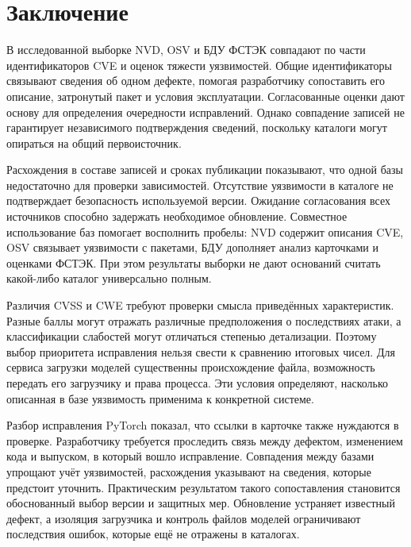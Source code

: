 \documentclass[12pt,a4paper]{report}
\begin{document}
\chapter*{Заключение}

В исследованной выборке NVD, OSV и БДУ ФСТЭК совпадают по части идентификаторов CVE и оценок тяжести уязвимостей. Общие идентификаторы связывают сведения об одном дефекте, помогая разработчику сопоставить его описание, затронутый пакет и условия эксплуатации. Согласованные оценки дают основу для определения очередности исправлений. Однако совпадение записей не гарантирует независимого подтверждения сведений, поскольку каталоги могут опираться на общий первоисточник.

Расхождения в составе записей и сроках публикации показывают, что одной базы недостаточно для проверки зависимостей. Отсутствие уязвимости в каталоге не подтверждает безопасность используемой версии. Ожидание согласования всех источников способно задержать необходимое обновление. Совместное использование баз помогает восполнить пробелы: NVD содержит описания CVE, OSV связывает уязвимости с пакетами, БДУ дополняет анализ карточками и оценками ФСТЭК. При этом результаты выборки не дают оснований считать какой-либо каталог универсально полным.

Различия CVSS и CWE требуют проверки смысла приведённых характеристик. Разные баллы могут отражать различные предположения о последствиях атаки, а классификации слабостей могут отличаться степенью детализации. Поэтому выбор приоритета исправления нельзя свести к сравнению итоговых чисел. Для сервиса загрузки моделей существенны происхождение файла, возможность передать его загрузчику и права процесса. Эти условия определяют, насколько описанная в базе уязвимость применима к конкретной системе.

Разбор исправления PyTorch показал, что ссылки в карточке также нуждаются в проверке. Разработчику требуется проследить связь между дефектом, изменением кода и выпуском, в который вошло исправление. Совпадения между базами упрощают учёт уязвимостей, расхождения указывают на сведения, которые предстоит уточнить. Практическим результатом такого сопоставления становится обоснованный выбор версии и защитных мер. Обновление устраняет известный дефект, а изоляция загрузчика и контроль файлов моделей ограничивают последствия ошибок, которые ещё не отражены в каталогах.
\end{document}
